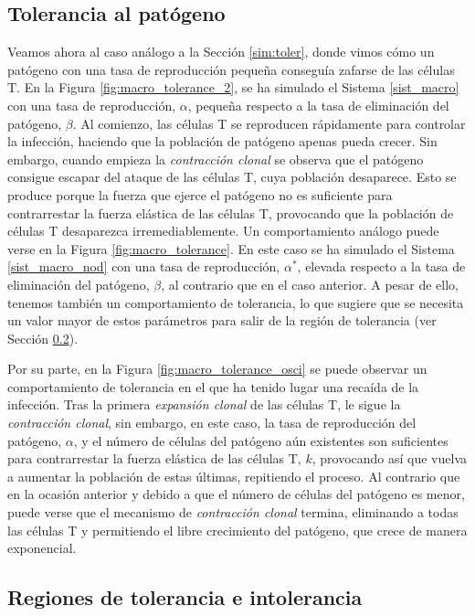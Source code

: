 \subsection{Tolerancia al patógeno}
\label{sub:simMacroToler}

Veamos ahora al caso análogo a la Sección \ref{sim:toler}, donde vimos cómo un patógeno con una tasa de reproducción pequeña conseguía zafarse de las células T. En la Figura \ref{fig:macro_tolerance_2}, se ha simulado el Sistema \ref{sist_macro} con una tasa de reproducción, $\alpha$, pequeña respecto a la tasa de eliminación del patógeno, $\beta$. Al comienzo, las células T se reproducen rápidamente para controlar la infección, haciendo que la población de patógeno apenas pueda crecer. Sin embargo, cuando empieza la \textit{contracción clonal} se observa que el patógeno consigue escapar del ataque de las células T, cuya población desaparece. Esto se produce porque la fuerza que ejerce el patógeno no es suficiente para contrarrestar la fuerza elástica de las células T, provocando que la población de células T desaparezca irremediablemente. Un comportamiento análogo puede verse en la Figura \ref{fig:macro_tolerance}. En este caso se ha simulado el Sistema \ref{sist_macro_nod} con una tasa de reproducción, $\alpha^{*}$, elevada respecto a la tasa de eliminación del patógeno, $\beta$, al contrario que en el caso anterior. A pesar de ello, tenemos también un comportamiento de tolerancia, lo que sugiere que se necesita un valor mayor de estos parámetros para salir de la región de tolerancia (ver Sección \ref{sub:reg_tolerIntolerMacro}).  

Por su parte, en la Figura \ref{fig:macro_tolerance_osci} se puede observar un comportamiento de tolerancia en el que ha tenido lugar una recaída de la infección. Tras la primera \textit{expansión clonal} de las células T, le sigue la \textit{contracción clonal}, sin embargo, en este caso, la tasa de reproducción del patógeno, $\alpha$, y el número de células del patógeno aún existentes son suficientes para contrarrestar la fuerza elástica de las células T, $k$, provocando así que vuelva a aumentar la población de estas últimas, repitiendo el proceso. Al contrario que en la ocasión anterior y debido a que el número de células del patógeno es menor, puede verse que el mecanismo de \textit{contracción clonal} termina, eliminando a todas las células T y permitiendo el libre crecimiento del patógeno, que crece de manera exponencial.

\subsection{Regiones de tolerancia e intolerancia}
\label{sub:reg_tolerIntolerMacro}

